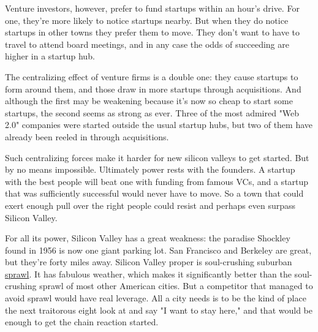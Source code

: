 Venture
                  investors, however, prefer to fund startups within an hour's
                  drive. For one, they're more likely to notice startups nearby.
                  But when they do notice startups in other towns they prefer
                  them to move. They don't want to have to travel to attend
                  board meetings, and in any case the odds of succeeding are
                  higher in a startup hub.

The centralizing effect of
                  venture firms is a double one: they cause startups to form
                  around them, and those draw in more startups through
                  acquisitions. And although the first may be weakening because
                  it's now so cheap to start some startups, the second seems as
                  strong as ever. Three of the most admired "Web 2.0" companies
                  were started outside the usual startup hubs, but two of them
                  have already been reeled in through acquisitions.

Such
                  centralizing forces make it harder for new silicon valleys to
                  get started. But by no means impossible. Ultimately power
                  rests with the founders. A startup with the best people will
                  beat one with funding from famous VCs, and a startup that was
                  sufficiently successful would never have to move. So a town
                  that could exert enough pull over the right people could
                  resist and perhaps even surpass Silicon Valley.

For
                  all its power, Silicon Valley has a great weakness: the
                  paradise Shockley found in 1956 is now one giant parking lot.
                  San Francisco and Berkeley are great, but they're forty miles
                  away. Silicon Valley proper is soul-crushing suburban
                  \href{http://www.flickr.com/photos/caterina/34637/}{sprawl}. It has fabulous weather, which makes it significantly
                  better than the soul-crushing sprawl of most other American
                  cities. But a competitor that managed to avoid sprawl would
                  have real leverage. All a city needs is to be the kind of
                  place the next traitorous eight look at and say "I want to
                  stay here," and that would be enough to get the chain reaction
                  started.






